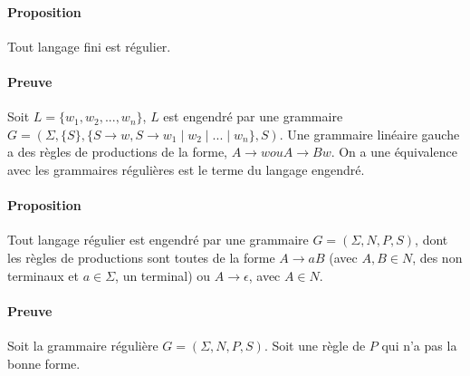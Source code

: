 \paragraph{Proposition} %
\label{par:proposition}

Tout langage fini est régulier.



\paragraph{Preuve} %
\label{par:preuve}

Soit $L = \{w_1, w_2, ... , w_n\}$, $L$ est engendré par une grammaire $G = (\Sigma , \{S\}, \{S \rightarrow w, S \rightarrow w_1 \mid w_2 \mid ... \mid w_n\},S)$.
Une grammaire linéaire gauche a des règles de productions de la forme, $A \rightarrow w ou A \rightarrow Bw$. On a une équivalence avec les grammaires régulières est le terme du langage engendré.



\paragraph{Proposition} %
\label{par:proposition}

Tout langage régulier est engendré par une grammaire $G=(\Sigma,N,P,S)$, dont les règles de productions sont toutes de la forme $A \rightarrow aB$ (avec $A,B \in N$, des non terminaux et $a \in \Sigma$, un terminal) ou $A \rightarrow \epsilon$, avec $A \in N$.



\paragraph{Preuve} %
\label{par:preuve}

Soit la grammaire régulière $G=(\Sigma,N,P,S)$. Soit une règle de $P$ qui n'a pas la bonne forme.

